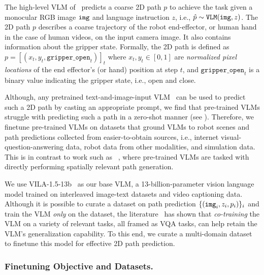 The high-level VLM of \method\ predicts a coarse 2D path $p$ to achieve the task given a monocular RGB image $\tt img$ and language instruction $z$, i.e., $\hat p \sim {\tt VLM}({\tt img},z)$. The 2D path $p$ describes a coarse trajectory of the robot end-effector, or human hand in the case of human videos, on the input camera image. It also contains information about the gripper state. Formally, the 2D path is defined as $p = [(x_t, y_t, \texttt{gripper\_open}_t)]_t$ where $x_t, y_t \in [0, 1]$ are \emph{normalized pixel locations} of the end effector's (or hand) position at step $t$, and $\texttt{gripper\_open}_t$ is a binary value indicating the gripper state, i.e., open and close. 

Although, any pretrained text-and-image-input VLM~\citep{vila2024, liu2024visual,openai2024gpt4} can be used to predict such a 2D path by casting an appropriate prompt, we find that pre-trained VLMs struggle with predicting such a path in a zero-shot manner (see ). Therefore, we finetune pre-trained VLMs on datasets that ground VLMs to robot scenes and path predictions collected from easier-to-obtain sources, i.e., internet visual-question-answering data, robot data from other modalities, and simulation data. This is in contrast to work such as ~\cite{gu2023rttrajectory}, where pre-trained VLMs are tasked with directly performing spatially relevant path generation.

We use VILA-1.5-13b~\citep{vila2024} as our base VLM, a 13-billion-parameter vision language model trained on interleaved image-text datasets and video captioning data. Although it is possible to curate a dataset on path prediction $\{({\tt img}_i,z_i,p_i)\}_i$ and train the VLM \emph{only} on the dataset, the literature~\citep{rt22023arxiv,yuan2024robopoint} has shown that \emph{co-training} the VLM on a variety of relevant tasks, all framed as VQA tasks, can help retain the VLM's generalization capability. 
To this end, we curate a multi-domain dataset to finetune this model for effective 2D path prediction. 

\subsubsection{Finetuning Objective and Datasets.}%

